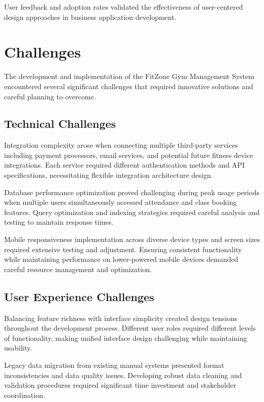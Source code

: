 \documentclass[12pt,a4paper]{report}
\begin{document}
User feedback and adoption rates validated the effectiveness of user-centered design approaches in business application development.

\section{Challenges}
\label{sec:challenges}

The development and implementation of the FitZone Gym Management System encountered several significant challenges that required innovative solutions and careful planning to overcome.

\subsection{Technical Challenges}

Integration complexity arose when connecting multiple third-party services including payment processors, email services, and potential future fitness device integrations. Each service required different authentication methods and API specifications, necessitating flexible integration architecture design.

Database performance optimization proved challenging during peak usage periods when multiple users simultaneously accessed attendance and class booking features. Query optimization and indexing strategies required careful analysis and testing to maintain response times.

Mobile responsiveness implementation across diverse device types and screen sizes required extensive testing and adjustment. Ensuring consistent functionality while maintaining performance on lower-powered mobile devices demanded careful resource management and optimization.

\subsection{User Experience Challenges}

Balancing feature richness with interface simplicity created design tensions throughout the development process. Different user roles required different levels of functionality, making unified interface design challenging while maintaining usability.

Legacy data migration from existing manual systems presented format inconsistencies and data quality issues. Developing robust data cleaning and validation procedures required significant time investment and stakeholder coordination.
\end{document}
